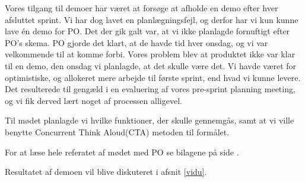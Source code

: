 Vores tilgang til demoer har været at forsøge at afholde en demo efter hver afsluttet sprint.
Vi har dog lavet en planlægningsfejl, og derfor har vi kun kunne lave én demo for PO.
Det der gik galt var, at vi ikke planlagde fornuftigt efter PO's skema.
PO gjorde det klart, at de havde tid hver onsdag, og vi var velkommende til at komme forbi.
Vores problem blev at produktet ikke var klar til en demo, den onsdag vi planlagde, at det skulle være det.
Vi havde været for optimistiske, og allokeret mere arbejde til første sprint, end hvad vi kunne levere.
Det resulterede til gengæld i en evaluering af vores pre-sprint planning meeting, og vi fik derved lært noget af processen alligevel.
   
Til mødet planlagde vi hvilke funktioner, der skulle gennemgås, samt at vi ville benytte Concurrent Think Aloud(CTA) metoden til formålet.\cite{cta}
   
For at læse hele referatet af mødet med PO se bilagene på side \pageref{demoreferat}.

Resultatet af demoen vil blive diskuteret i afsnit \ref{vidu}.